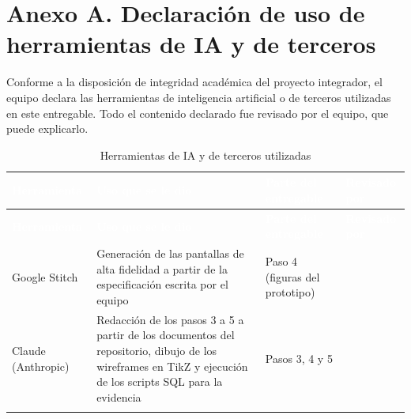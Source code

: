 \documentclass[11pt,a4paper]{article}
\newcommand{\cab}[1]{\textcolor{white}{\textbf{#1}}}
\newcommand{\fila}{\rule{0pt}{2.2em}}
\begin{document}
\newpage
\section*{Anexo A. Declaración de uso de herramientas de IA y de terceros}

Conforme a la disposición de integridad académica del proyecto integrador, el equipo declara
las herramientas de inteligencia artificial o de terceros utilizadas en este entregable. Todo
el contenido declarado fue revisado por el equipo, que puede explicarlo.

\begin{xltabular}{\linewidth}{|P{3.4cm}|L|P{3cm}|P{2.8cm}|}
  \caption{Herramientas de IA y de terceros utilizadas}\label{tab:declaracion-ia}\\
  \hline
  \cab{Herramienta} & \cab{Uso que se le dio} & \cab{Parte del entregable} & \cab{Revisado por} \\ \hline
  \endfirsthead
  \hline
  \cab{Herramienta} & \cab{Uso que se le dio} & \cab{Parte del entregable} & \cab{Revisado por} \\ \hline
  \endhead
  Google Stitch & Generación de las pantallas de alta fidelidad a partir de la especificación
    escrita por el equipo & Paso 4 (figuras del prototipo) & \\ \hline
  Claude (Anthropic) & Redacción de los pasos 3 a 5 a partir de los documentos del repositorio,
    dibujo de los wireframes en TikZ y ejecución de los scripts SQL para la evidencia &
    Pasos 3, 4 y 5 & \\ \hline
  \fila & & & \\ \hline
\end{xltabular}
\end{document}
